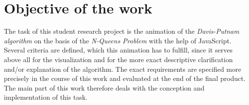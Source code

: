 \section{Objective of the work}
\label{sec:introObjective}
The task of this student research project is the animation of the \textit{Davis-Putnam algorithm} on the basis of the \textit{N-Queens Problem} with the help of JavaScript. Several criteria are defined, which this animation has to fulfill, since it serves above all for the visualization and for the more exact descriptive clarification and/or explanation of the algorithm. The exact requirements are specified more precisely in the course of this work and evaluated at the end of the final product. The main part of this work therefore deals with the conception and implementation of this task.


